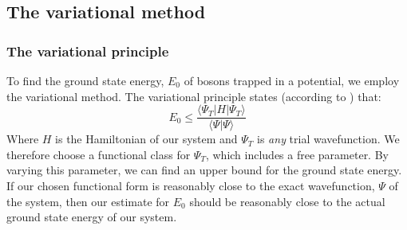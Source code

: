 \documentclass[a4paper, 10pt]{article}
\begin{document}
	\subsection{The variational method}
	\subsubsection{The variational principle}
	To find the ground state energy, $E_0$ of bosons trapped in a potential, we employ the variational method. The variational principle states (according to \cite{Griffiths2004}) that:
	\begin{equation}\label{eq:Variational_principle}
	E_0\leq  \frac{\langle \Psi_T |H|\Psi_T \rangle}{\langle \Psi|\Psi\rangle}
	\end{equation}
	Where $H$ is the Hamiltonian of our system and $\Psi_T$ is \textit{any} trial wavefunction. We therefore choose a functional class for $\Psi_T$, which includes a free parameter. By varying this parameter, we can find an upper bound for the ground state energy. If our chosen functional form is reasonably close to the exact wavefunction, $\Psi$ of the system, then our estimate for $E_0$ should be reasonably close to the actual ground state energy of our system.
\end{document}
